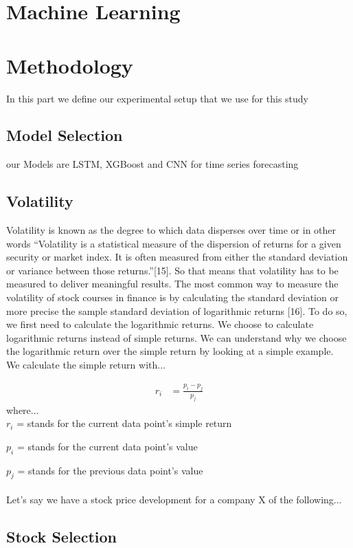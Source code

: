 \documentclass[a4paper,12pt]{report}
\begin{document}
\chapter{Machine Learning}

\chapter{Methodology}
In this part we define our experimental setup that we use for this study
	\section{Model Selection}
	our Models are LSTM, XGBoost and CNN for time series forecasting
	
	\section{Volatility}
	Volatility is known as the degree to which data disperses over time or in other words “Volatility is a statistical measure of the dispersion of returns for a given security or market index. It is often measured from either the standard deviation or variance between those returns.”[15]. So that means that volatility has to be measured to deliver meaningful results. The most common way to measure the volatility of stock courses in finance is by calculating the standard deviation or more precise the sample standard deviation of logarithmic returns [16]. To do so, we first need to calculate the logarithmic returns. We choose to calculate logarithmic returns instead of simple returns. We can understand why we choose the logarithmic return over the simple return by looking at a simple example.\\
We calculate the simple return with...

\begin{align}
r_i &= \frac{p_i - p_j}{p_j}
\end{align}
where...\\

$r_i$ = stands for the current data point’s simple return

$p_i$ = stands for the current data point’s value

$p_j$ = stands for the previous data point’s value\\\\
Let's say we have a stock price development for a company X of the following...


	\section{Stock Selection}
\end{document}
